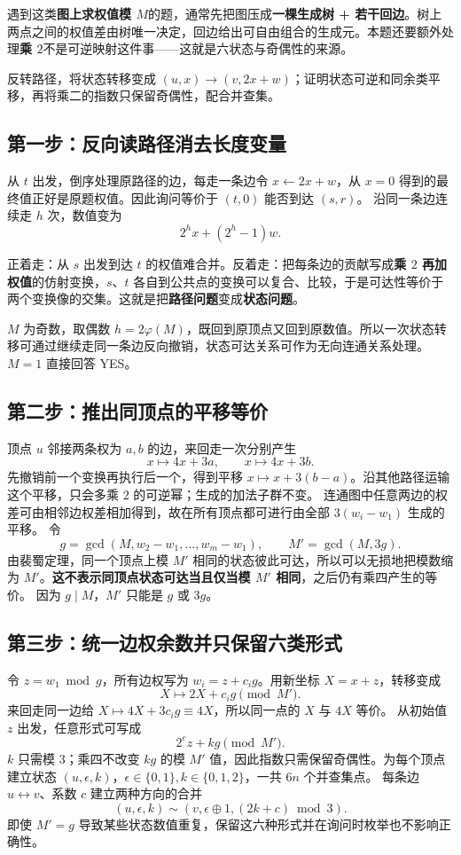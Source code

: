 \begin{tip}
遇到这类\textbf{图上求权值模 $M$}的题，通常先把图压成\textbf{一棵生成树 + 若干回边}。树上两点之间的权值差由树唯一决定，回边给出可自由组合的生成元。本题还要额外处理\textbf{乘 $2$}不是可逆映射这件事——这就是六状态与奇偶性的来源。
\end{tip}

\hint 反转路径，将状态转移变成 $(u,x)\to(v,2x+w)$；证明状态可逆和同余类平移，再将乘二的指数只保留奇偶性，配合并查集。

\subsection{第一步：反向读路径消去长度变量}
从 $t$ 出发，倒序处理原路径的边，每走一条边令 $x\gets2x+w$，从 $x=0$ 得到的最终值正好是原题权值。因此询问等价于 $(t,0)$ 能否到达 $(s,r)$。
沿同一条边连续走 $h$ 次，数值变为
\[
 2^hx+(2^h-1)w.
\]

\begin{tip}
正着走：从 $s$ 出发到达 $t$ 的权值难合并。反着走：把每条边的贡献写成\textbf{乘 $2$ 再加权值}的仿射变换，$s$、$t$ 各自到公共点的变换可以复合、比较，于是可达性等价于两个变换像的交集。这就是把\textbf{路径问题}变成\textbf{状态问题}。
\end{tip}

$M$ 为奇数，取偶数 $h=2\varphi(M)$，既回到原顶点又回到原数值。所以一次状态转移可通过继续走同一条边反向撤销，状态可达关系可作为无向连通关系处理。$M=1$ 直接回答 YES。

\subsection{第二步：推出同顶点的平移等价}
顶点 $u$ 邻接两条权为 $a,b$ 的边，来回走一次分别产生
\[
 x\mapsto4x+3a,\qquad x\mapsto4x+3b.
\]
先撤销前一个变换再执行后一个，得到平移 $x\mapsto x+3(b-a)$。沿其他路径运输这个平移，只会多乘 $2$ 的可逆幂；生成的加法子群不变。
连通图中任意两边的权差可由相邻边权差相加得到，故在所有顶点都可进行由全部 $3(w_i-w_1)$ 生成的平移。
令
\[
 g=\gcd(M,w_2-w_1,\ldots,w_m-w_1),\qquad M'=\gcd(M,3g).
\]
由裴蜀定理，同一个顶点上模 $M'$ 相同的状态彼此可达，所以可以无损地把模数缩为 $M'$。\textbf{这不表示同顶点状态可达当且仅当模 $M'$ 相同}，之后仍有乘四产生的等价。
因为 $g\mid M$，$M'$ 只能是 $g$ 或 $3g$。

\subsection{第三步：统一边权余数并只保留六类形式}
令 $z=w_1\bmod g$，所有边权写为 $w_i=z+c_ig$。用新坐标 $X=x+z$，转移变成
\[
 X\mapsto2X+c_ig\pmod{M'}.
\]
来回走同一边给 $X\mapsto4X+3c_ig\equiv4X$，所以同一点的 $X$ 与 $4X$ 等价。
从初始值 $z$ 出发，任意形式可写成
\[
 2^ez+kg\pmod{M'}.
\]
$k$ 只需模 $3$；乘四不改变 $kg$ 的模 $M'$ 值，因此指数只需保留奇偶性。为每个顶点建立状态 $(u,\epsilon,k)$，$\epsilon\in\{0,1\},k\in\{0,1,2\}$，一共 $6n$ 个并查集点。
每条边 $u\leftrightarrow v$、系数 $c$ 建立两种方向的合并
\[
 (u,\epsilon,k)\sim(v,\epsilon\oplus1,(2k+c)\bmod3).
\]
即使 $M'=g$ 导致某些状态数值重复，保留这六种形式并在询问时枚举也不影响正确性。

